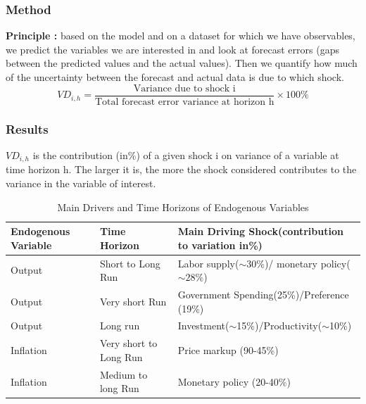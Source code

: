 \documentclass{article}
\begin{document}
\subsubsection{Method}
\textbf{Principle :} based on the model and on a dataset for which we have observables, we predict the variables we are interested in and look at forecast errors (gaps between the predicted values and the actual values). Then we quantify how much of the uncertainty between the forecast and actual data is due to which shock. 
\begin{equation}
    VD_{i,h} = \frac{\text{Variance due to shock i}}{\text{Total forecast error variance at horizon h}}\times100\%
\end{equation}
\subsubsection{Results}
$VD_{i,h}$ is the contribution (in\%) of a given shock i on variance of a variable at time horizon h. The larger it is, the more the shock considered contributes to the variance in the variable of interest. 

\begin{table}[H]  
    \centering  
    \begin{threeparttable}  
    \caption{Main Drivers and Time Horizons of Endogenous Variables}  
    \label{tab:main_drivers_time}  
    \begin{tabular}{lll}  
        \toprule  
        \textbf{Endogenous Variable} & \textbf{Time Horizon} & \textbf{Main Driving Shock(contribution to variation in\%)} \\  
        \midrule  
        Output       & Short to Long Run     & Labor supply($\sim30\%$)/ monetary policy($\sim28\%$) \\  
        Output & Very short Run & Government Spending(25\%)/Preference (19\%)\\
        Output & Long run & Investment($\sim$15\%)/Productivity($\sim$10\%)\\
        Inflation & Very short to Long Run& Price markup (90-45\%) \\
        Inflation & Medium to long Run & Monetary policy (20-40\%)\\
        \bottomrule  
    \end{tabular}  
    \end{threeparttable}  
\end{table}  
\end{document}
